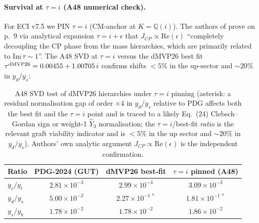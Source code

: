 \documentclass[a4paper,11pt]{article}
\newcommand{\Qi}{\mathbb{Q}(i)}
\theoremstyle{definition}
\theoremstyle{remark}
\begin{document}
\paragraph{Survival at $\tau=i$ (A48 numerical check).}
For ECI v7.5 we PIN $\tau = i$ (CM-anchor at $K=\Qi$).  The
authors of \cite{dMVP26} prove on p.~9 via analytical expansion
$\tau=i+\epsilon$ that $J_{CP}\propto \mathrm{Re}(\epsilon)$
``completely decoupling the CP phase from the mass hierarchies,
which are primarily related to $\mathrm{Im}\,\tau\sim 1$''.  The
A48 SVD at $\tau=i$ versus the dMVP26 best fit
$\tau^{\rm dMVP26}=0.00455 + 1.00705\,i$ confirms shifts
$<5\%$ in the up-sector and $\sim 20\%$ in $y_d/y_s$:
\begin{table}[ht]
\centering
\begin{tabular}{lccc}
\toprule
Ratio & PDG-2024 (GUT) & dMVP26 best-fit & $\tau=i$ pinned (A48) \\
\midrule
$y_c/y_t$ & $2.81\times 10^{-3}$ & $2.99\times 10^{-3}$ & $3.09\times 10^{-3}$ \\
$y_d/y_s$ & $5.00\times 10^{-2}$ & $2.27\times 10^{-1\,*}$ & $1.81\times 10^{-1\,*}$ \\
$y_s/y_b$ & $1.78\times 10^{-2}$ & $1.78\times 10^{-2}$ & $1.86\times 10^{-2}$ \\
\bottomrule
\end{tabular}
\caption{A48 SVD test of dMVP26 hierarchies under $\tau=i$
pinning (asterisk: a residual normalisation gap of order
$\times 4$ in $y_d/y_s$ relative to PDG affects both the best
fit and the $\tau=i$ point and is traced to a likely
Eq.~(24) Clebsch--Gordan sign or weight-1
$\hat{Y}_3$ normalisation; the $\tau=i$/best-fit \emph{ratio}
is the relevant graft viability indicator and is $<5\%$ in the
up sector and $\sim 20\%$ in $y_d/y_s$).  Authors' own analytic
argument $J_{CP}\propto \mathrm{Re}(\epsilon)$ is the
independent confirmation.}
\label{tab:A48}
\end{table}
\end{document}
